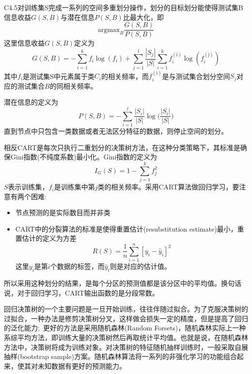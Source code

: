 \documentclass[10pt, oneside, a4paper]{article}      %
\newcommand{\upcite}[1]{\hspace{0ex}\textsuperscript{\cite{#1}}} %
\begin{document}
\textrm{C4.5}对训练集\textrm{S}完成一系列的空间多重划分操作，划分的目标划分能使得测试集\textrm{B}信息收益$G(S,B)$与潜在信息$P(S,B)$比最大化，即
\begin{displaymath}
	\mathrm{argmax}_B\dfrac{G(S,B)}{P(S,B)}
\end{displaymath}
这里信息收益$G(S,B)$定义为
\begin{displaymath}
	G(S,B)=-\sum_{i=1}^kf_i\log(f_i)+\sum_{j=1}^l\dfrac{|S_j|}{|S|}\sum_{i=1}^kf_i^{(\mathrm{i})}\log(f_i^{(\mathrm{j})})
\end{displaymath}
其中$f_i$是测试集\textrm{S}中元素属于类$C_i$的相关频率，而$f_i^{(\mathrm{i})}$是与测试集合划分空间$S_j$对应的测试集合$B$的同相关频率。

潜在信息的定义为
\begin{displaymath}
	P(S,B)=-\sum_{i=1}^l\dfrac{|S_i|}{|S|}\log\bigg(\dfrac{|S_i|}{|S|}\bigg)
\end{displaymath}
直到节点中只包含一类数据或者无法区分特征的数据，则停止空间的划分。

相反\textrm{CART}是每次只执行二重划分的决策树方法，在这种分类策略下，其标准是确保\textrm{Gini}指数(不纯度系数)最小化。\textrm{Gini}指数的定义为
\begin{displaymath}
	I_G(S)=1-\sum_{j=1}^kf_j^2
\end{displaymath}
$S$表示训练集，$f_i$是训练集中第$j$类的相关频率。采用\textrm{CART}算法做回归学习，要注意有两个困难:
\begin{itemize}
	\item 节点预测的是实际数目而并非类
	\item \textrm{CART}中的分裂算法的标准是使得重置估计\textrm{(resubstitution estimate)}最小，重置估计的定义为方差
		\begin{displaymath}
			R(S)=\dfrac1n\sum_{i=1}^n[y_i-\hat{y}_i]^2
		\end{displaymath}
		这里$y_i$是第$i$个数据的标签，而$\hat{y}_i$则是对应的估计值。
\end{itemize}
所以采用这种划分的结果，是每个分区的预测值都是该分区中的平均值。换句话说，对于回归学习，\textrm{CART}输出函数的是分段常数。

回归决策树的一个主要问题是一旦开始训练，往往伴随过拟合。为了克服决策树的过拟合，一种办法是修剪决策树分叉，这样做会损失一定的精度，但是提高了回归的泛化能力;~更好的方法是采用随机森林\textrm{(Random Forsets)}，随机森林实际上一种系综平均方法，即训练大量的决策树然后再取统计平均值\upcite{ML45-5_2001}。也就是说，在随机森林方法中，决策树将成为训练对象。对决策树的特征随机抽样训练时，一般采取自展抽样\textrm{(bootstrap sample)}方案。随机森林算法将一系列的非强化学习的功能组合起来，使其对未知数据有更好的预测能力。
\end{document}
